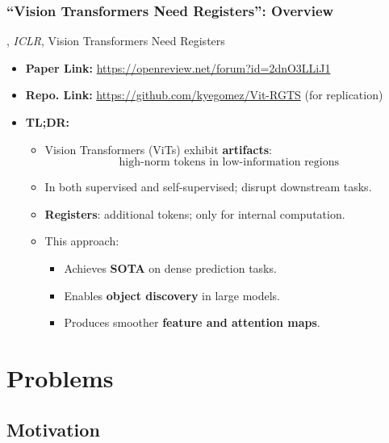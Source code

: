 \documentclass[aspectratio=169]{beamer}
\begin{document}
\frame{\titlepage}%

\begin{frame}
\frametitle{``Vision Transformers Need Registers'': Overview}

\cite{darcetVisionTransformersNeed2024}, \textit{ICLR}, Vision Transformers Need Registers

\vspace{1em}

\begin{itemize}
    \item \textbf{Paper Link:} \href{https://openreview.net/forum?id=2dnO3LLiJ1}{https://openreview.net/forum?id=2dnO3LLiJ1}
    \item \textbf{Repo. Link:} \href{https://github.com/kyegomez/Vit-RGTS}{https://github.com/kyegomez/Vit-RGTS} \quad (for replication)

    \vspace{1em}

    \item \textbf{TL;DR:}
    \begin{itemize}
        \item Vision Transformers (ViTs) exhibit \textbf{artifacts}: 
        $$\boxed{\text{high-norm tokens in low-information regions}}$$
        \item In both supervised and self-supervised; disrupt downstream tasks.
        \item \textbf{Registers}: additional tokens; only for internal computation.
        \item This approach:
        \begin{itemize}
            \item Achieves \textbf{SOTA} on dense prediction tasks.
            \item Enables \textbf{object discovery} in large models.
            \item Produces smoother \textbf{feature and attention maps}.
        \end{itemize}
    \end{itemize}
\end{itemize}
\end{frame}

\section{Problems}

\subsection{Motivation}
\end{document}
